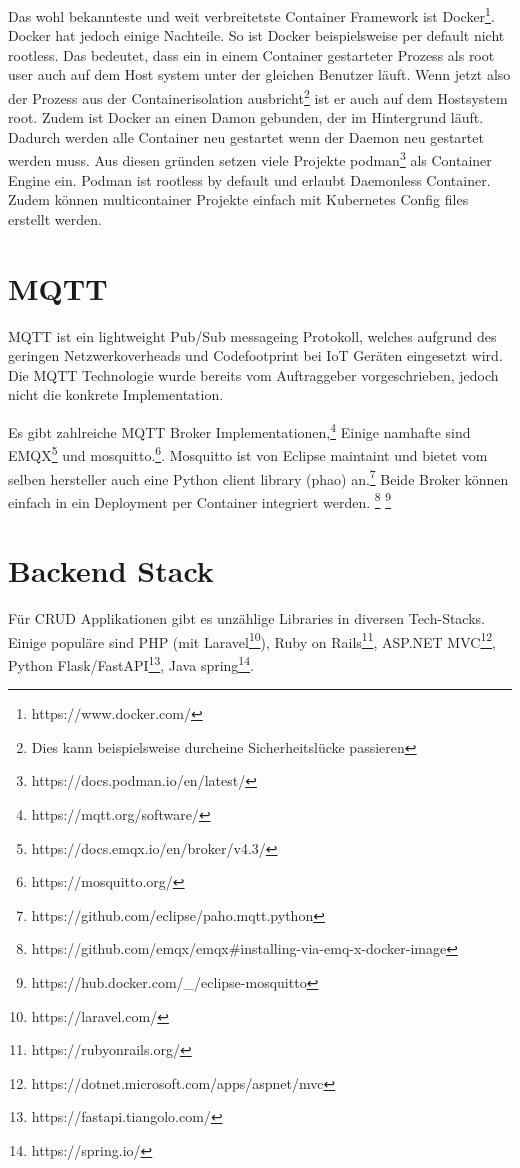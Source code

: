 Das wohl bekannteste und weit verbreitetste Container Framework
ist Docker\footnote{https://www.docker.com/}. Docker hat jedoch einige Nachteile.
So ist Docker beispielsweise per default nicht rootless.\cite{docker:rootless}
Das bedeutet, dass ein in einem Container gestarteter Prozess als root user
auch auf dem Host system unter der gleichen Benutzer läuft. Wenn jetzt also
der Prozess aus der Containerisolation ausbricht\footnote{Dies kann beispielsweise durcheine Sicherheitslücke passieren}
ist er auch auf dem Hostsystem root.\cite{so_2020}
Zudem ist Docker an einen Damon gebunden, der im Hintergrund läuft.
Dadurch werden alle Container neu gestartet wenn der Daemon neu gestartet werden muss.\cite{docker:daemon}
Aus diesen gründen setzen viele Projekte podman\footnote{https://docs.podman.io/en/latest/}
als Container Engine ein. Podman ist rootless by default und erlaubt Daemonless Container.
Zudem können multicontainer Projekte einfach mit Kubernetes Config files
erstellt werden.\cite{redhat:podman-pods}

\section{MQTT}

\ac{MQTT} ist ein lightweight Pub/Sub messageing Protokoll, welches aufgrund des
geringen Netzwerkoverheads und Codefootprint bei \ac{IoT} Geräten eingesetzt wird.\cite{mqtt}
Die \ac{MQTT} Technologie wurde bereits vom Auftraggeber vorgeschrieben, jedoch
nicht die konkrete Implementation.

Es gibt zahlreiche \ac{MQTT} Broker Implementationen,\footnote{https://mqtt.org/software/}
Einige namhafte sind EMQX\footnote{https://docs.emqx.io/en/broker/v4.3/} und mosquitto.\footnote{https://mosquitto.org/}.
Mosquitto ist von Eclipse maintaint und bietet vom selben hersteller auch eine
Python client library (phao) an.\footnote{https://github.com/eclipse/paho.mqtt.python}
Beide Broker können einfach in ein Deployment per Container integriert werden.
\footnote{https://github.com/emqx/emqx\#installing-via-emq-x-docker-image} \footnote{https://hub.docker.com/\_/eclipse-mosquitto}

\section{Backend Stack}

Für \ac{CRUD} Applikationen gibt es unzählige Libraries in diversen Tech-Stacks.
Einige populäre sind PHP (mit Laravel\footnote{https://laravel.com/}),
Ruby on Rails\footnote{https://rubyonrails.org/}, ASP.NET MVC\footnote{https://dotnet.microsoft.com/apps/aspnet/mvc},
Python Flask/FastAPI\footnote{https://fastapi.tiangolo.com/}, Java spring\footnote{https://spring.io/}.

